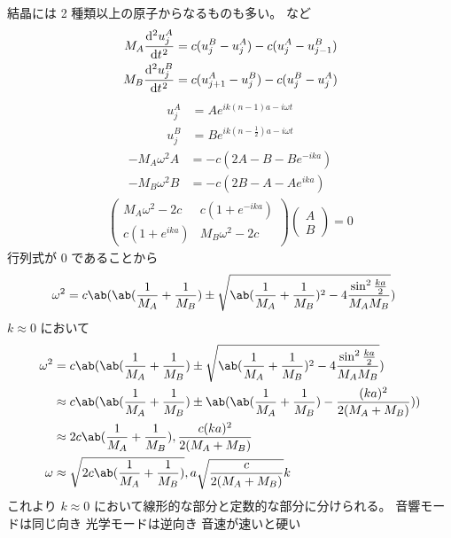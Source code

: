 \documentclass[uplatex,dvipdfmx,a4paper,11pt]{jlreq}
\numberwithin{equation}{section}
\theoremstyle{definition}
\begin{document}
\subsection{}
結晶には 2 種類以上の原子からなるものも多い。
 など
\begin{align}
  M_A\diff[2]{u_j^A}{t} & = c(u_j^B - u_j^A) - c(u_j^A - u_{j-1}^B) \\
  M_B\diff[2]{u_j^B}{t} & = c(u_{j+1}^A - u_j^B) - c(u_j^B - u_j^A)
\end{align}
\begin{align}
  u_j^A & = Ae^{ik(n-1)a - i\omega t}           \\
  u_j^B & = Be^{ik(n-\frac{1}{2})a - i\omega t}
\end{align}
\begin{align}
  -M_A\omega^2A & = -c(2A - B - Be^{-ika}) \\
  -M_B\omega^2B & = -c(2B - A - Ae^{ika})
\end{align}
\begin{align}
  \begin{pmatrix}
    M_A\omega^2 - 2c & c(1 + e^{-ika})  \\
    c(1 + e^{ika})   & M_B\omega^2 - 2c
  \end{pmatrix}
  \begin{pmatrix}
    A \\ B
  \end{pmatrix}
  = 0
\end{align}
行列式が $0$ であることから
\begin{align}
  \omega^2 & = c\ab(\ab(\frac{1}{M_A} + \frac{1}{M_B})\pm\sqrt{\ab(\frac{1}{M_A} + \frac{1}{M_B})^2 - 4\frac{\sin^2\frac{ka}{2}}{M_AM_B}})
\end{align}
$k \approx 0$ において
\begin{align}
  \omega^2 & = c\ab(\ab(\frac{1}{M_A} + \frac{1}{M_B})\pm\sqrt{\ab(\frac{1}{M_A} + \frac{1}{M_B})^2 - 4\frac{\sin^2\frac{ka}{2}}{M_AM_B}}) \\
           & \approx c\ab(\ab(\frac{1}{M_A} + \frac{1}{M_B})\pm\ab(\ab(\frac{1}{M_A} + \frac{1}{M_B}) - \frac{(ka)^2}{2(M_A + M_B)}))      \\
           & \approx 2c\ab(\frac{1}{M_A} + \frac{1}{M_B}), \frac{c(ka)^2}{2(M_A + M_B)}                                                    \\
  \omega   & \approx \sqrt{2c\ab(\frac{1}{M_A} + \frac{1}{M_B})}, a\sqrt{\frac{c}{2(M_A + M_B)}}k
\end{align}
これより $k \approx 0$ において線形的な部分と定数的な部分に分けられる。
音響モードは同じ向き
光学モードは逆向き
音速が速いと硬い
\end{document}
